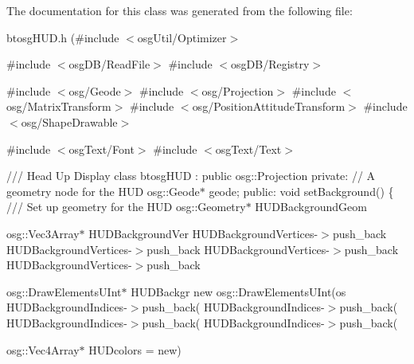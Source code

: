 The documentation for this class was generated from the following file\+:\begin{DoxyCompactItemize}
\item 
btosg\+H\+U\+D.\+h (\#include $<$osg\+Util/\+Optimizer$>$

\#include $<$osg\+D\+B/\+Read\+File$>$
\#include $<$osg\+D\+B/\+Registry$>$

\#include $<$osg/\+Geode$>$
\#include $<$osg/\+Projection$>$
\#include $<$osg/\+Matrix\+Transform$>$
\#include $<$osg/\+Position\+Attitude\+Transform$>$
\#include $<$osg/\+Shape\+Drawable$>$

\#include $<$osg\+Text/\+Font$>$
\#include $<$osg\+Text/\+Text$>$


/// Head Up Display
class btosg\+H\+U\+D \+: public osg\+::\+Projection 
private\+:
    // A geometry node for the H\+U\+D
    osg\+::\+Geode$\ast$ geode;
public\+:
    void set\+Background() \{
        /// Set up geometry for the H\+U\+D 
        osg\+::\+Geometry$\ast$ H\+U\+D\+Background\+Geom

        osg\+::\+Vec3\+Array$\ast$ H\+U\+D\+Background\+Ver
        H\+U\+D\+Background\+Vertices-\/$>$push\+\_\+back
        H\+U\+D\+Background\+Vertices-\/$>$push\+\_\+back
        H\+U\+D\+Background\+Vertices-\/$>$push\+\_\+back
        H\+U\+D\+Background\+Vertices-\/$>$push\+\_\+back

        osg\+::\+Draw\+Elements\+U\+Int$\ast$ H\+U\+D\+Backgr
            new osg\+::\+Draw\+Elements\+U\+Int(os
        H\+U\+D\+Background\+Indices-\/$>$push\+\_\+back(
        H\+U\+D\+Background\+Indices-\/$>$push\+\_\+back(
        H\+U\+D\+Background\+Indices-\/$>$push\+\_\+back(
        H\+U\+D\+Background\+Indices-\/$>$push\+\_\+back(

        osg\+::\+Vec4\+Array$\ast$ H\+U\+Dcolors = new)\end{DoxyCompactItemize}
